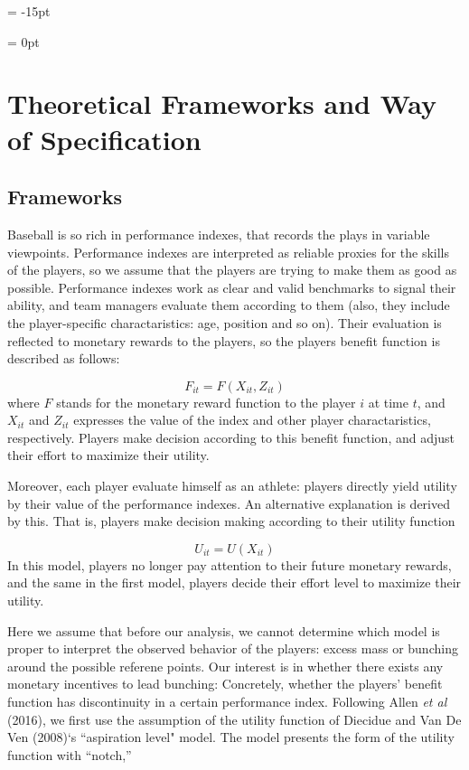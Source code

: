 \documentclass[dvipdfmx, 12pt]{article}
\begin{document}
\leftskip = -15pt
\begin{table}
  
\end{table}
\leftskip = 0pt

\section{Theoretical Frameworks and Way of Specification}

\subsection{Frameworks}

Baseball is so rich in performance indexes, that records the plays in variable viewpoints. Performance indexes are interpreted as reliable proxies for the skills of the players, so we assume that the players are trying to make them as good as possible. Performance indexes work as clear and valid benchmarks to signal their ability, and team managers evaluate them according to them (also, they include the player-specific charactaristics: age, position and so on). Their evaluation is reflected to monetary rewards to the players, so the players benefit function is described as follows:

\[
F_{it} = F(X_{it}, Z_{it})
\]
where $F$ stands for the monetary reward function to the player $i$ at time $t$, and $X_{it}$ and $Z_{it}$ expresses the value of the index and other player charactaristics, respectively. Players make decision according to this benefit function, and adjust their effort to maximize their utility.

Moreover, each player evaluate himself as an athlete: players directly yield utility by their value of the performance indexes. An alternative explanation is derived by this. That is, players make decision making according to their utility function

\[
U_{it} = U(X_{it})
\]
In this model, players no longer pay attention to their future monetary rewards, and the same in the first model, players decide their effort level to maximize their utility.

Here we assume that before our analysis, we cannot determine which model is proper to interpret the observed behavior of the players: excess mass or bunching around the possible referene points. Our interest is in whether there exists any monetary incentives to lead bunching: Concretely, whether the players' benefit function has discontinuity in a certain performance index. Following Allen \textit{et al} (2016), we first use the assumption of the utility function of Diecidue and Van De Ven (2008)`s ``aspiration level" model. The model presents the form of the utility function with ``notch,''
\end{document}
